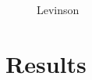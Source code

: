 
\begin{figure}
	\centering
	
	\caption{Levinson}
	\label{fig:levinson}
\end{figure}

\section{Results}
\label{sec:miningresults}



































